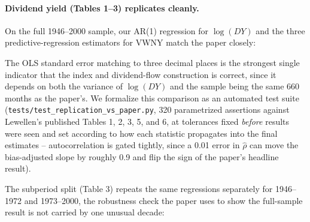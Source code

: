 \documentclass[11pt]{article}
\newcommand{\PathToOutput}{../_output}
\begin{document}
\paragraph{Dividend yield (Tables 1--3) replicates cleanly.} On the full
1946--2000 sample, our AR(1) regression for \(\log(DY)\) and the three
predictive-regression estimators for VWNY match the paper closely:

\begin{table}[H]
\centering

\caption{Table 2 (dividend yield predicts NYSE returns, 1946--2000, SIZ
panel): OLS, Stambaugh (1999), and the \(\rho \approx 1\) conditional test,
for nominal and excess VWNY/EWNY. Compare the \(\rho \approx 1\) row's
\(\hat b = \TableTwoOursRhoOneB\) (\(t = \TableTwoOursRhoOneT\)) against the
paper's published \(0.663\) (\(t = 4.67\)) for VWNY -- the OLS standard
error (\(\TableTwoOursOLSse\) vs.\ the paper's published \(0.476\)) is the
single strongest indicator that the underlying dividend-flow and index
construction is correct.}
\label{tab:table2-compare}
\end{table}

The OLS standard error matching to three decimal places is the strongest
single indicator that the index and dividend-flow construction is correct,
since it depends on both the variance of \(\log(DY)\) and the sample being
the same 660 months as the paper's. We formalize this comparison as an
automated test suite (\texttt{tests/test\_replication\_vs\_paper.py}, 320
parametrized assertions against Lewellen's published Tables 1, 2, 3, 5, and
6, at tolerances fixed \emph{before} results were seen and set according to
how each statistic propagates into the final estimates -- autocorrelation
is gated tightly, since a 0.01 error in \(\hat\rho\) can move the
bias-adjusted slope by roughly 0.9 and flip the sign of the paper's
headline result).

The subperiod split (Table 3) repeats the same regressions separately for
1946--1972 and 1973--2000, the robustness check the paper uses to show the
full-sample result is not carried by one unusual decade:

\begin{table}[H]
\centering

\caption{Table 3a (dividend yield predicts NYSE returns, 1946--1972, SIZ
panel). The paper finds strong predictability in this subperiod despite the
shorter sample -- the \(\rho \approx 1\) row is the one to check against
that claim.}
\label{tab:table3a}
\end{table}
\end{document}
